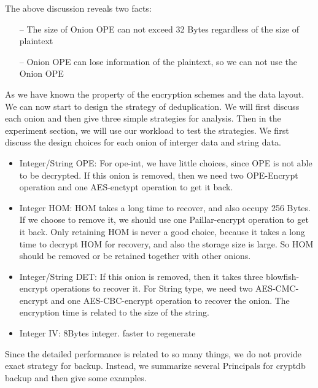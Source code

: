 The above discussion reveals two facts:

\begin{itemize}
\item[--] The size of Onion OPE can not exceed 32 Bytes regardless of the size of plaintext
\item[--] Onion OPE can lose information of the plaintext, so we can not use the Onion OPE
\end{itemize}



As we have known the property of the encryption schemes and the data layout. We can now start to design the strategy of deduplication. We will first discuss each onion and then give three simple strategies for analysis. Then in the experiment section, we will use our workload to test the strategies. We first discuss the design choices for each onion of interger data and string data. 


\begin{itemize}
\item Integer/String OPE: For ope-int, we have little choices, since OPE is not able to be decrypted. If this onion is removed, then we need two OPE-Encrypt operation and one AES-enctypt operation to get it back. 
\item Integer HOM: HOM takes a long time to recover, and also occupy 256 Bytes. If we choose to remove it, we should use one Paillar-encrypt operation to get it back. Only retaining HOM is never a good choice, because it takes a long time to decrypt HOM for recovery, and also the storage size is large. So HOM should be removed or be retained together with other onions.
\item Integer/String DET: If this onion is removed, then it takes three blowfish-encrypt operations to recover it. For String type, we need two AES-CMC-encrypt and one AES-CBC-encrypt operation to recover the onion. The encryption time is related to the size of the string.
\item Integer IV: 8Bytes integer. faster to regenerate
\end{itemize}



Since the detailed performance is related to so many things, we do not provide exact strategy for backup. Instead, we summarize several Principals for cryptdb backup and then give some examples. 


